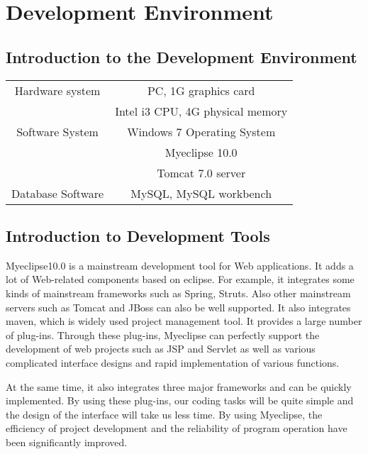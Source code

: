 \section{Development Environment}
\subsection{Introduction to the Development Environment}
\begin{tabular}{c|c}
\hline
Hardware system & PC, 1G graphics card\\
 & Intel i3 CPU, 4G physical memory\\
\hline
Software System & Windows 7 Operating System \\

& Myeclipse 10.0\\
& Tomcat 7.0 server\\
\hline
Database Software & MySQL, MySQL workbench\\
\hline
\end{tabular}
\subsection{Introduction to Development Tools}

Myeclipse10.0 is a mainstream development tool for Web applications. It adds a lot of Web-related components based on eclipse. For example, it integrates some kinds of mainstream frameworks such as Spring, Struts. Also other mainstream servers such as Tomcat and JBoss can also be well supported. It also integrates maven, which is widely used project management tool. It provides a large number of plug-ins. Through these plug-ins, Myeclipse can perfectly support the development of web projects such as JSP and Servlet as well as various complicated interface designs and rapid implementation of various functions. 

At the same time, it also integrates three major frameworks and can be quickly implemented. By using these plug-ins, our coding tasks will be quite simple and the design of the interface will take us less time. By using Myeclipse, the efficiency of project development and the reliability of program operation have been significantly improved.

